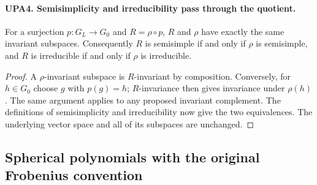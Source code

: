 \paragraph{UPA4. Semisimplicity and irreducibility pass through the quotient.}
\label{claim:UPA4}
For a surjection $p:G_L\to G_0$ and $R=\rho\circ p$,
$R$ and $\rho$ have exactly the same invariant subspaces.
Consequently $R$ is semisimple if and only if $\rho$ is
semisimple, and $R$ is irreducible if and only if $\rho$
is irreducible.
\begin{proof}
A $\rho$-invariant subspace is $R$-invariant by composition.
Conversely, for $h\in G_0$ choose $g$ with $p(g)=h$;
$R$-invariance then gives invariance under $\rho(h)$.
The same argument applies to any proposed invariant
complement.  The definitions of semisimplicity and
irreducibility now give the two equivalences.  The
underlying vector space and all of its subspaces are
unchanged.
\end{proof}

\subsection{Spherical polynomials with the original Frobenius convention}

